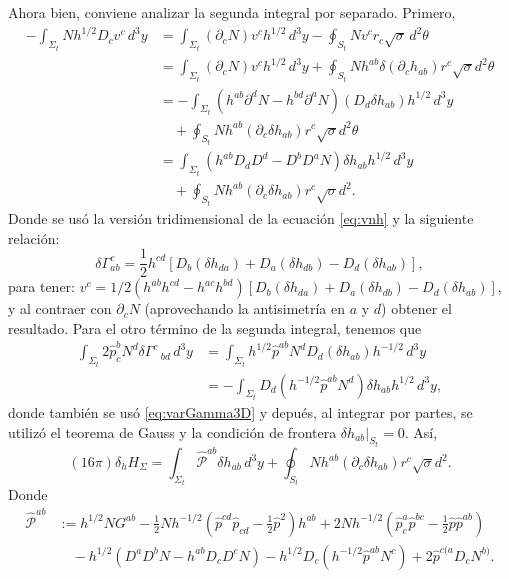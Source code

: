 Ahora bien, conviene analizar la segunda integral por separado. Primero,
%
\begin{align*}
- \int_{\Sigma_{t}} N h^{1/2} D_{c} v^{c} \, d^{3} y & = \int_{\Sigma_{t}} (\partial_{c} N) v^{c} h^{1/2} \, d^{3} y - \oint_{S_{t}} N v^{c} r_{c} \sqrt{\sigma} \, d^{2} \theta \\
& = \int_{\Sigma_{t}} (\partial_{c} N) v^{c} h^{1/2} \, d^{3} y + \oint_{S_{t}} N h^{ab} \delta (\partial_{c} h_{ab}) r^{c} \sqrt{\sigma} d^{2} \theta \\
& = - \int_{\Sigma_{t}} (h^{ab} \partial^{d} N - h^{bd} \partial^{a} N) (D_{d} \delta h_{ab}) h^{1/2} \, d^{3} y \\
& \quad + \oint_{S_{t}} N h^{ab} (\partial_{c} \delta h_{ab}) r^{c} \sqrt{\sigma} d^{2} \theta \\
& = \int_{\Sigma_{t}} (h^{ab} D_{d} D^{d} - D^{b} D^{a} N) \delta h_{ab} h^{1/2} \, d^{3} y \\
& \quad + \oint_{S_{t}} N h^{ab} (\partial_{c} \delta h_{ab}) r^{c} \sqrt{\sigma} d^{2}.
\end{align*}
%
Donde se us\'{o} la versi\'{o}n tridimensional de la ecuaci\'{o}n \eqref{eq:vnh} y la siguiente relaci\'{o}n:
%
\begin{equation}
\label{eq:varGamma3D}
\delta \Gamma^{c}_{ab} = \frac{1}{2} h^{cd} \left[D_{b} (\delta h_{da}) + D_{a} (\delta h_{db}) - D_{d} (\delta h_{ab}) \right],
\end{equation}
%
para tener: $v^{c} = 1/2 (h^{ab} h^{cd} - h^{ac} h^{bd}) [D_{b} (\delta h_{da}) + D_{a} (\delta h_{db}) - D_{d} (\delta h_{ab})]$, y al contraer con $\partial_{c} N$ (aprovechando la antisimetr\'{i}a en $a$ y $d$) obtener el resultado. Para el otro t\'{e}rmino de la segunda integral, tenemos que
%
\begin{align*}
\int_{\Sigma_{t}} 2 \hat{p}^{b}_{c} N^{d} \delta \Gamma^{c}\,_{bd} \, d^{3} y & = \int_{\Sigma_{t}} h^{1/2} \hat{p}^{ab} N^{d} D_{d} (\delta h_{ab}) h^{-1/2} \, d^{3} y \\
& = - \int_{\Sigma_{t}} D_{d} (h^{-1/2} \hat{p}^{ab} N^{d}) \delta h_{ab} h^{1/2} \, d^{3} y,
\end{align*}
%
donde tambi\'{e}n se us\'{o} \eqref{eq:varGamma3D} y depu\'{e}s, al integrar por partes, se utiliz\'{o} el teorema de Gauss y la condici\'{o}n de frontera $\delta h_{ab} \vert_{S_{t}} = 0$. As\'{i},
%
\begin{equation}
\label{eq:varHSigma}
(16 \pi) \delta_{h} H_{\Sigma} = \int_{\Sigma_{t}} \hat{\mathcal{P}}^{ab} \delta h_{ab} \, d^{3} y + \oint_{S_{t}} N h^{ab} (\partial_{c} \delta h_{ab}) r^{c} \sqrt{\sigma} d^{2}.
\end{equation}
%
Donde
%
\begin{align*}
\hat{\mathcal{P}}^{ab} & := h^{1/2} N G^{ab} - \frac{1}{2} N h^{-1/2} (\hat{p}^{cd} \hat{p}_{cd} - \frac{1}{2} \hat{p}^{2}) h^{ab} + 2 N h^{-1/2} (\hat{p}^{a}_{c} \hat{p}^{bc} - \frac{1}{2} \hat{p} \hat{p}^{ab}) \\
& \quad -h^{1/2} (D^{a} D^{b} N - h^{ab} D_{c} D^{c} N) - h^{1/2} D_{c} (h^{-1/2} \hat{p}^{ab} N^{c}) + 2 \hat{p}^{c(a} D_{c} N^{b)}.
\end{align*}

